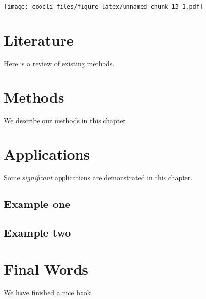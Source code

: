 \documentclass[
]{book}
\begin{document}
\texttt{[image: coocli\_files/figure-latex/unnamed-chunk-13-1.pdf]}

\hypertarget{literature}{%
\chapter{Literature}\label{literature}}

Here is a review of existing methods.

\hypertarget{methods}{%
\chapter{Methods}\label{methods}}

We describe our methods in this chapter.

\hypertarget{applications}{%
\chapter{Applications}\label{applications}}

Some \emph{significant} applications are demonstrated in this chapter.

\hypertarget{example-one}{%
\section{Example one}\label{example-one}}

\hypertarget{example-two}{%
\section{Example two}\label{example-two}}

\hypertarget{final-words}{%
\chapter{Final Words}\label{final-words}}

We have finished a nice book.
\end{document}
